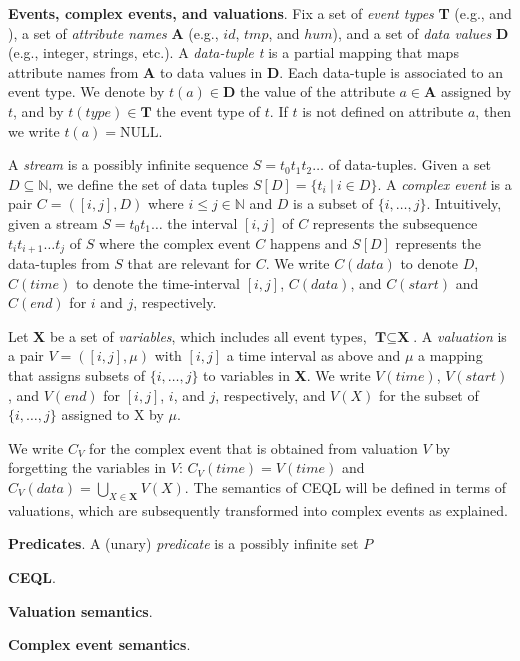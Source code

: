 \textbf{Events, complex events, and valuations}. Fix a set of \emph{event types} \textbf{T} (e.g.,  and ), a set of \emph{attribute names} \textbf{A} (e.g., $id$, $tmp$, and $hum$), and a set of \emph{data values} \textbf{D} (e.g., integer, strings, etc.). A \emph{data-tuple t} is a partial mapping that maps attribute names from \textbf{A} to data values in \textbf{D}. Each data-tuple is associated to an event type. We denote by $t(a) \in \textbf{D}$ the value of the attribute $a \in \textbf{A}$ assigned by $t$, and by $t(type) \in \textbf{T}$ the event type of $t$. If $t$ is not defined on attribute $a$, then we write $t(a) = \text{NULL}$.

A \emph{stream} is a possibly infinite sequence $S = t_{0}t_{1}t_{2}\ldots$ of data-tuples. Given a set $D \subseteq \mathbb{N}$, we define the set of data tuples $S[D] = \{ t_{i} \ | \ i \in D\}$. A \emph{complex event} is a pair $C = ([i,j], D)$ where $i \le j \in \mathbb{N}$ and $D$ is a subset of $\{i, \ldots, j\}$. Intuitively, given a stream $S = t_{0}t_{1}\ldots$ the interval $[i, j]$ of $C$ represents the subsequence $t_{i}t_{i+1} \ldots t_{j}$ of $S$ where the complex event $C$ happens and $S[D]$ represents the data-tuples from $S$ that are relevant for $C$. We write $C(data)$ to denote $D$, $C(time)$ to denote the time-interval $[i, j]$, $C(data)$, and $C(start)$ and $C(end)$ for $i$ and $j$, respectively.

Let \textbf{X} be a set of \emph{variables}, which includes all event types, $\textbf{T} \subseteq \textbf{X}$. A \emph{valuation} is a pair $V = ([i, j], \mu)$ with $[i,j]$ a time interval as above and $\mu$ a mapping that assigns subsets of $\{i, \ldots, j\}$ to variables in \textbf{X}. We write $V(time)$, $V(start)$, and $V(end)$ for $[i,j]$, $i$, and $j$, respectively, and $V(X)$ for the subset of $\{i,\ldots, j\}$ assigned to X by $\mu$.

We write $C_{V}$ for the complex event that is obtained from valuation $V$ by forgetting the variables in $V$: $C_{V}(time) = V(time)$ and $C_{V}(data) = \bigcup\limits_{X \in \textbf{X}} V(X)$. The semantics of CEQL will be defined in terms of valuations, which are subsequently transformed into complex events as explained.

\textbf{Predicates}. A (unary) \emph{predicate} is a possibly infinite set $P$

\textbf{CEQL}.

\textbf{Valuation semantics}.

\textbf{Complex event semantics}.

